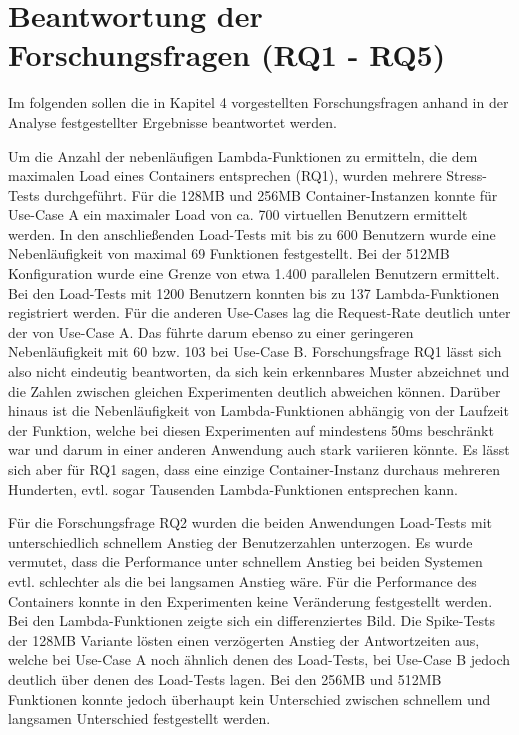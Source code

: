\section{Beantwortung der Forschungsfragen (RQ1 - RQ5)}
Im folgenden sollen die in Kapitel 4 vorgestellten Forschungsfragen anhand in der Analyse festgestellter Ergebnisse beantwortet werden.

Um die Anzahl der nebenläufigen Lambda-Funktionen zu ermitteln, die dem maximalen Load eines Containers entsprechen (RQ1), wurden mehrere Stress-Tests durchgeführt. Für die 128MB und 256MB Container-Instanzen konnte für Use-Case A ein maximaler Load von ca. 700 virtuellen Benutzern ermittelt werden. In den anschließenden Load-Tests mit bis zu 600 Benutzern wurde eine Nebenläufigkeit von maximal 69 Funktionen festgestellt. Bei der 512MB Konfiguration wurde eine Grenze von etwa 1.400 parallelen Benutzern ermittelt. Bei den Load-Tests mit 1200 Benutzern konnten bis zu 137 Lambda-Funktionen registriert werden. 
Für die anderen Use-Cases lag die Request-Rate deutlich unter der von Use-Case A. Das führte darum ebenso zu einer geringeren Nebenläufigkeit mit 60 bzw. 103 bei Use-Case B. 
Forschungsfrage RQ1 lässt sich also nicht eindeutig beantworten, da sich kein erkennbares Muster abzeichnet und die Zahlen zwischen gleichen Experimenten deutlich abweichen können. Darüber hinaus ist die Nebenläufigkeit von Lambda-Funktionen abhängig von der Laufzeit der Funktion, welche bei diesen Experimenten auf mindestens 50ms beschränkt war und darum in einer anderen Anwendung auch stark variieren könnte. Es lässt sich aber für RQ1 sagen, dass eine einzige Container-Instanz durchaus mehreren Hunderten, evtl. sogar Tausenden Lambda-Funktionen entsprechen kann.

Für die Forschungsfrage RQ2 wurden die beiden Anwendungen Load-Tests mit unterschiedlich schnellem Anstieg der Benutzerzahlen unterzogen. Es wurde vermutet, dass die Performance unter schnellem Anstieg bei beiden Systemen evtl. schlechter als die bei langsamen Anstieg wäre. Für die Performance des Containers konnte in den Experimenten keine Veränderung festgestellt werden. Bei den Lambda-Funktionen zeigte sich ein differenziertes Bild. Die Spike-Tests der 128MB Variante lösten einen verzögerten Anstieg der Antwortzeiten aus, welche bei Use-Case A noch ähnlich denen des Load-Tests, bei Use-Case B jedoch deutlich über denen des Load-Tests lagen. Bei den 256MB und 512MB Funktionen konnte jedoch überhaupt kein Unterschied zwischen schnellem und langsamen Unterschied festgestellt werden. 

